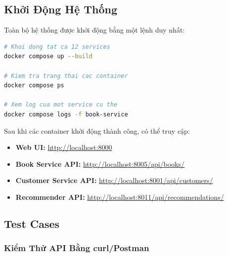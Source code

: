 \documentclass[12pt,a4paper]{article}
\begin{document}
\subsection{Khởi Động Hệ Thống}

Toàn bộ hệ thống được khởi động bằng một lệnh duy nhất:

\begin{lstlisting}[language=bash, caption={Lện khởi động hệ thống}]
# Khoi dong tat ca 12 services
docker compose up --build

# Kiem tra trang thai cac container
docker compose ps

# Xem log cua mot service cu the
docker compose logs -f book-service
\end{lstlisting}

Sau khi các container khởi động thành công, có thể truy cập:
\begin{itemize}[leftmargin=1.5cm]
  \item \textbf{Web UI:} \url{http://localhost:8000}
  \item \textbf{Book Service API:} \url{http://localhost:8005/api/books/}
  \item \textbf{Customer Service API:} \url{http://localhost:8001/api/customers/}
  \item \textbf{Recommender API:} \url{http://localhost:8011/api/recommendations/}
\end{itemize}

\subsection{Test Cases}

\subsubsection{Kiểm Thử API Bằng curl/Postman}
\end{document}
